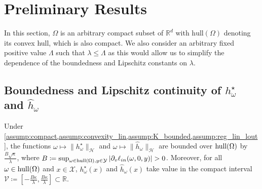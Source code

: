 \section{Preliminary Results}\label{sec_app:prel_res}
{In this section, $\Omega$ is an arbitrary compact subset of $\mathbb{R}^d$  with $\text{hull}(\Omega)$ denoting its convex hull, which is also compact.} 
We also consider an arbitrary fixed positive value $\Lambda$ such that $\lambda \leq \Lambda$ as this would allow us to simplify the dependence of the boundedness and Lipschitz constants on $\lambda$.   

\subsection{Boundedness and Lipschitz continuity of $h^\star_\omega$ and $\hat{h}_\omega$}
\begin{proposition}\label{prop:bound_hstaromega}
Under \cref{assump:compact,assump:convexity_lin,assump:K_bounded,assump:reg_lin_lout}, the functions $\omega\mapsto \|h^\star_\omega\|_\mathcal{H}$ and $\omega\mapsto\|\hat{h}_\omega\|_\mathcal{H}$ are bounded over $\textnormal{hull}(\Omega)$ by $\frac{B\sqrt{\kappa}}{\lambda}$, where $B\coloneqq\sup_{\omega\in\textnormal{hull}(\Omega),y\in\mathcal{Y}}\left|\partial_v \ell_{in}(\omega, 0, y)\right|>0$. Moreover, for all $\omega\in\textnormal{hull}(\Omega)$ and $x\in\mathcal{X}$, $h^\star_\omega(x)$ and $\hat{h}_\omega(x)$ take value in the compact interval $\mathcal{V}\coloneqq\left[-\frac{B\kappa}{\lambda},\frac{B\kappa}{\lambda}\right]\subset\mathbb{R}$.
\end{proposition}

